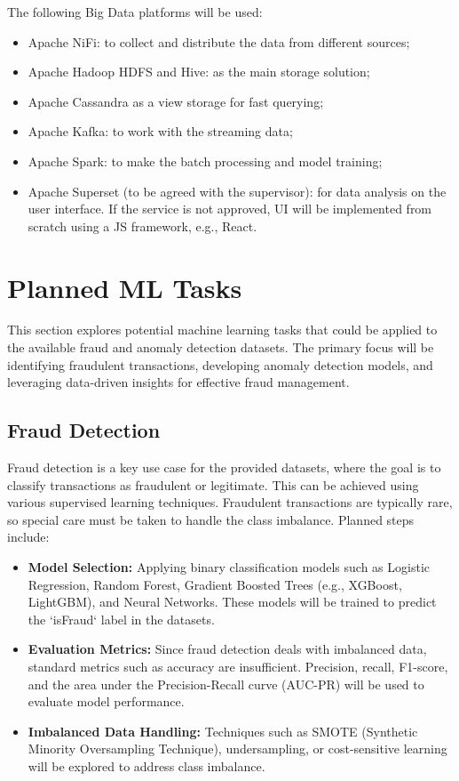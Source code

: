 \documentclass[12pt,a4paper, hidelinks]{article}
\begin{document}
The following Big Data platforms will be used:
\begin{itemize}
    \item Apache NiFi: to collect and distribute the data from different sources;
    \item Apache Hadoop HDFS and Hive: as the main storage solution;
    \item Apache Cassandra as a view storage for fast querying;
    \item Apache Kafka: to work with the streaming data;
    \item Apache Spark: to make the batch processing and model training;
    \item Apache Superset (to be agreed with the supervisor): for data analysis on the user interface. If the service is not approved, UI will be implemented from scratch using a JS framework, e.g., React.
\end{itemize}

\section{Planned ML Tasks}

This section explores potential machine learning tasks that could be applied to the available fraud and anomaly detection datasets. The primary focus will be identifying fraudulent transactions, developing anomaly detection models, and leveraging data-driven insights for effective fraud management. 

\subsection{Fraud Detection}
Fraud detection is a key use case for the provided datasets, where the goal is to classify transactions as fraudulent or legitimate. This can be achieved using various supervised learning techniques. Fraudulent transactions are typically rare, so special care must be taken to handle the class imbalance. Planned steps include:
\begin{itemize}
    \item \textbf{Model Selection:} Applying binary classification models such as Logistic Regression, Random Forest, Gradient Boosted Trees (e.g., XGBoost, LightGBM), and Neural Networks. These models will be trained to predict the `isFraud` label in the datasets.
    \item \textbf{Evaluation Metrics:} Since fraud detection deals with imbalanced data, standard metrics such as accuracy are insufficient. Precision, recall, F1-score, and the area under the Precision-Recall curve (AUC-PR) will be used to evaluate model performance.
    \item \textbf{Imbalanced Data Handling:} Techniques such as SMOTE (Synthetic Minority Oversampling Technique), undersampling, or cost-sensitive learning will be explored to address class imbalance.
\end{itemize}
\end{document}

